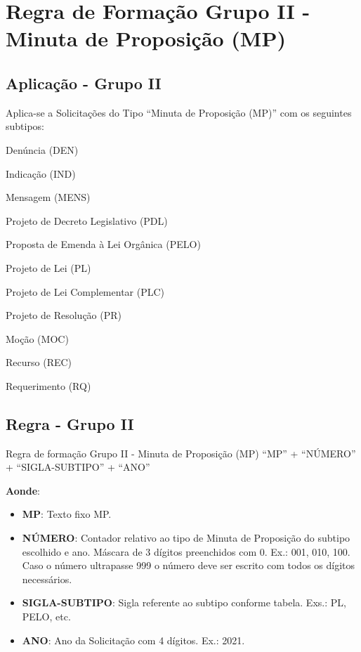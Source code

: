 \section{Regra de Formação Grupo II - Minuta de Proposição (MP)}

\subsection{Aplicação - Grupo II}

\begin{env-aplica}{Aplica-se a Solicitações do Tipo ``Minuta de Proposição (MP)'' com os seguintes subtipos:}
	\item Denúncia (DEN)
	\item Indicação (IND)
	\item Mensagem (MENS) 
	\item Projeto de Decreto Legislativo (PDL)
	\item Proposta de Emenda à Lei Orgânica (PELO)
	\item Projeto de Lei (PL)
	\item Projeto de Lei Complementar (PLC) 
	\item Projeto de Resolução (PR)
	\item Moção (MOC)
	\item Recurso (REC)
	\item Requerimento (RQ)		
\end{env-aplica}

\subsection{Regra - Grupo II}

\begin{env-regra}{Regra de formação Grupo II - Minuta de Proposição (MP)}
	``MP'' + ``NÚMERO'' + ``SIGLA-SUBTIPO'' + ``ANO''
\end{env-regra}
 
\textbf{Aonde}:

\begin{itemize}
	\item \textbf{MP}: Texto fixo MP. 
	\item \textbf{NÚMERO}: Contador relativo ao tipo de Minuta de Proposição do subtipo escolhido e ano. Máscara de 3 dígitos preenchidos com 0. Ex.: 001, 010, 100. Caso o número ultrapasse 999 o número deve ser escrito com todos os dígitos necessários. 

	\item \textbf{SIGLA-SUBTIPO}: Sigla referente ao subtipo conforme tabela. Exs.: PL, PELO, etc.

	\item \textbf{ANO}: Ano da Solicitação com 4 dígitos. Ex.: 2021.
\end{itemize}

